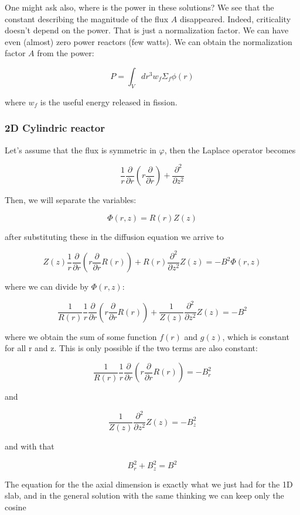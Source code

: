 One might ask also, where is the power in these solutions? We see that the constant describing the magnitude of the flux $A$ disappeared. Indeed, criticality doesn't depend on the power. That is just a normalization factor. We can have even (almost) zero power reactors (few watts). We can obtain the normalization factor $A$ from the power:

\begin{equation}
P=\int_V dr^3 w_f\Sigma_f\phi(r)
\end{equation}

\noindent where $w_f$ is the useful energy released in fission.

\subsubsection*{2D Cylindric reactor}

Let's assume that the flux is symmetric in $\varphi$, then the Laplace operator becomes


\[
\frac{1}{r}\frac{\partial}{\partial r}(r\frac{\partial}{\partial r})+\frac{\partial^2}{\partial z^2}
\]

Then, we will separate the variables:

\[
\Phi(r,z)=R(r)Z(z)
\]

\noindent after substituting these in the diffusion equation we arrive to

\[
Z(z)\frac{1}{r}\frac{\partial}{\partial r}(r\frac{\partial}{\partial r}R(r))+R(r)\frac{\partial^2}{\partial z^2}Z(z)=-B^2\Phi(r,z)
\]

\noindent where we can divide by $\Phi(r,z)$:

\[
\frac{1}{R(r)}\frac{1}{r}\frac{\partial}{\partial r}(r\frac{\partial}{\partial r}R(r))+\frac{1}{Z(z)}\frac{\partial^2}{\partial z^2}Z(z)=-B^2
\]

\noindent where we obtain the sum of some function $f(r)$ and $g(z)$, which is constant for all r and z. This is only possible if the two terms are also constant:


\[
\frac{1}{R(r)}\frac{1}{r}\frac{\partial}{\partial r}(r\frac{\partial}{\partial r}R(r))=-B_r^2
\]

\noindent and

\[
\frac{1}{Z(z)}\frac{\partial^2}{\partial z^2}Z(z)=-B_z^2
\]

\noindent and with that

\[
B_r^2+B_z^2=B^2
\]

The equation for the the axial dimension is exactly what we just had for the 1D slab, and in the general solution with the same thinking we can keep only the cosine 

